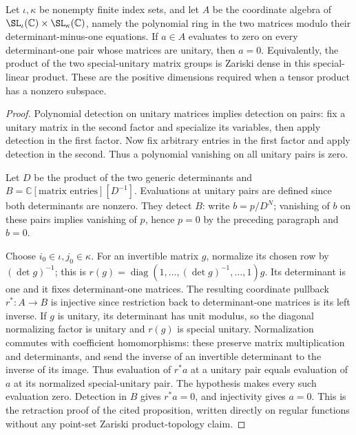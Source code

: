 \begin{lemma}
\label{lem:balanced-unitary-density}
\leanok
{}
Let $\iota,\kappa$ be nonempty finite index sets, and let $A$ be the
coordinate algebra of $\SL_\iota(\mathbb C)\times\SL_\kappa(\mathbb C)$,
namely the polynomial ring in the two matrices modulo their
determinant-minus-one equations. If $a\in A$ evaluates to zero on
every determinant-one pair whose matrices are unitary, then $a=0$.
Equivalently, the product of the two special-unitary matrix groups is
Zariski dense in this special-linear product. These are the positive
dimensions required when a tensor product has a nonzero subspace.
\end{lemma}
\begin{proof}
Polynomial detection on unitary matrices implies detection on pairs:
fix a unitary matrix in the second factor and specialize its variables,
then apply detection in the first factor. Now fix arbitrary entries in
the first factor and apply detection in the second. Thus a polynomial
vanishing on all unitary pairs is zero.

Let $D$ be the product of the two generic determinants and
$B=\mathbb C[\text{matrix entries}][D^{-1}]$. Evaluations at unitary
pairs are defined since both determinants are nonzero. They detect
$B$: write $b=p/D^N$; vanishing of $b$ on these pairs implies vanishing
of $p$, hence $p=0$ by the preceding paragraph and $b=0$.

Choose $i_0\in\iota,j_0\in\kappa$. For an invertible matrix $g$,
normalize its chosen row by $(\det g)^{-1}$; this is
$r(g)=\operatorname{diag}(1,\ldots,(\det g)^{-1},\ldots,1)g$.
Its determinant is one and it fixes determinant-one matrices.
The resulting coordinate pullback $r^*:A\to B$ is injective since
restriction back to determinant-one matrices is its left inverse.
If $g$ is unitary, its determinant has unit modulus, so the diagonal
normalizing factor is unitary and $r(g)$ is special unitary.
Normalization commutes with coefficient homomorphisms: these preserve
matrix multiplication and determinants, and send the inverse of an
invertible determinant to the inverse of its image. Thus evaluation
of $r^*a$ at a unitary pair equals evaluation of $a$ at its normalized
special-unitary pair. The hypothesis makes every such evaluation zero.
Detection in $B$ gives $r^*a=0$, and injectivity gives $a=0$.
This is the retraction proof of the cited proposition, written directly
on regular functions without any point-set Zariski product-topology claim.
\end{proof}

